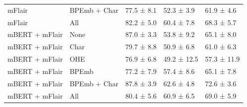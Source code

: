 \documentclass[12pt,a4paper,]{book}
\begin{document}
\begin{longtable}[t]{lllll}
\hspace{1em}mFlair & BPEmb + Char & 77.5 ±  8.1 & 52.3 ±  3.9 & 61.9 ±  4.6\\
\hspace{1em}mFlair & All & 82.2 ±  5.0 & 60.4 ±  7.8 & 68.3 ±  5.7\\
\hspace{1em}mBERT + mFlair & None & 87.0 ±  3.3 & 53.8 ±  9.2 & 65.1 ±  8.0\\
\hspace{1em}mBERT + mFlair & Char & 79.7 ±  8.8 & 50.9 ±  6.8 & 61.0 ±  6.3\\
\hspace{1em}mBERT + mFlair & OHE & 76.9 ±  6.8 & 49.2 ± 12.5 & 57.3 ± 11.9\\
\hspace{1em}mBERT + mFlair & BPEmb & 77.2 ±  7.9 & 57.4 ±  8.6 & 65.1 ±  7.8\\
\hspace{1em}mBERT + mFlair & BPEmb + Char & 87.8 ±  3.9 & 62.6 ±  4.8 & 72.6 ±  3.6\\
\hspace{1em}mBERT + mFlair & All & 80.4 ±  5.6 & 60.9 ±  6.5 & 69.0 ±  5.9\\*
\end{longtable}
\endgroup{}

\newpage

\begingroup\fontsize{10}{12}\selectfont
\end{document}
